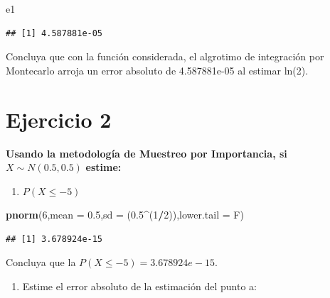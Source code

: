 \documentclass[
]{article}
\newenvironment{Shaded}{\begin{snugshade}}{\end{snugshade}}
\newcommand{\AttributeTok}[1]{\textcolor[rgb]{0.13,0.29,0.53}{#1}}
\newcommand{\DecValTok}[1]{\textcolor[rgb]{0.00,0.00,0.81}{#1}}
\newcommand{\FloatTok}[1]{\textcolor[rgb]{0.00,0.00,0.81}{#1}}
\newcommand{\FunctionTok}[1]{\textcolor[rgb]{0.13,0.29,0.53}{\textbf{#1}}}
\newcommand{\NormalTok}[1]{#1}
\newcommand{\SpecialCharTok}[1]{\textcolor[rgb]{0.81,0.36,0.00}{\textbf{#1}}}
\providecommand{\tightlist}{%
  \setlength{\itemsep}{0pt}\setlength{\parskip}{0pt}}
\begin{document}
\begin{Shaded}
\begin{Highlighting}[]
\NormalTok{e1}
\end{Highlighting}
\end{Shaded}

\begin{verbatim}
## [1] 4.587881e-05
\end{verbatim}

Concluya que con la función considerada, el algrotimo de integración por
Montecarlo arroja un error absoluto de 4.587881e-05 al estimar ln(2).

\newpage

\hypertarget{ejercicio-2}{%
\section{Ejercicio 2}\label{ejercicio-2}}

\textbf{Usando la metodología de Muestreo por Importancia, si }
\(X \sim N(0.5,0.5)\) \textbf{estime:}

\begin{enumerate}
\def\labelenumi{\alph{enumi}.}
\tightlist
\item
  \(P(X \leq -5)\)
\end{enumerate}

\begin{Shaded}
\begin{Highlighting}[]
\FunctionTok{pnorm}\NormalTok{(}\DecValTok{6}\NormalTok{,}\AttributeTok{mean =} \FloatTok{0.5}\NormalTok{,}\AttributeTok{sd =}\NormalTok{ (}\FloatTok{0.5}\SpecialCharTok{\^{}}\NormalTok{(}\DecValTok{1}\SpecialCharTok{/}\DecValTok{2}\NormalTok{)),}\AttributeTok{lower.tail =}\NormalTok{ F)}
\end{Highlighting}
\end{Shaded}

\begin{verbatim}
## [1] 3.678924e-15
\end{verbatim}

Concluya que la \(P(X \leq -5) = 3.678924e-15\).

\begin{enumerate}
\def\labelenumi{\alph{enumi}.}
\setcounter{enumi}{1}
\tightlist
\item
  Estime el error absoluto de la estimación del punto a:
\end{enumerate}
\end{document}
